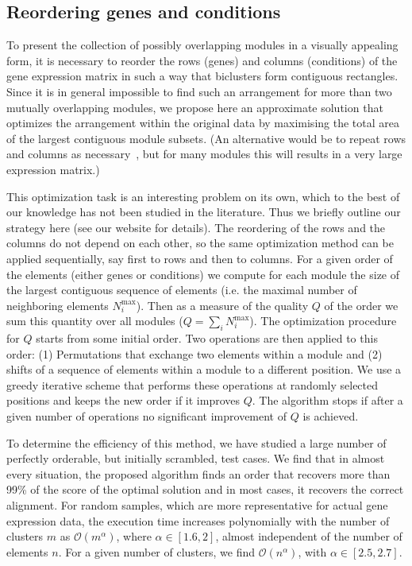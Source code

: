 \documentclass[round]{bioinfo}
\begin{document}
\subsection{Reordering genes and conditions}
To present the collection of possibly overlapping modules in a visually
appealing form, it is necessary to reorder the rows (genes) and
columns (conditions) of the
gene expression matrix in such a way that biclusters form contiguous
rectangles. Since it is in general impossible to find such an
arrangement for more than two mutually overlapping modules, we propose
here an approximate solution that optimizes the arrangement within the
original data by maximising the total area of the largest contiguous
module subsets. (An alternative would be to repeat rows and columns as
necessary~\citep{grothaus06}, but for many modules this will results in
a very large expression matrix.) 

This optimization task is an interesting problem on its own, which to
the best of our knowledge has not been studied in the literature. Thus
we briefly outline our strategy here (see our website for details). 
The reordering of the rows and the columns do not depend on each
other, so the same optimization method can be applied sequentially,
say first to rows and then to columns. For a given order of the
elements (either genes or conditions) we compute for each module the
size of the largest contiguous sequence of elements (i.e. the maximal
number of neighboring elements $N^\text{max}_i$). Then as a measure of the
quality $Q$ of the order we sum this quantity over all modules
($Q=\sum_i N^\text{max}_i$). The optimization procedure for $Q$ starts from
some initial order. Two operations are then applied to this order: (1)
Permutations that exchange two elements within a module and (2) shifts
of a sequence of elements within a module to a different position. We
use a greedy iterative scheme that performs these operations at
randomly selected positions and keeps the new order if it improves
$Q$. The algorithm stops if after a given number of operations no
significant improvement of $Q$ is achieved. 

To determine the efficiency of this method, we have studied a large
number of perfectly orderable, but initially scrambled, test cases. We
find that in almost every situation, the proposed algorithm finds an
order that recovers more than 99\% of the score of the optimal
solution and in most cases, it recovers the correct
alignment. For random samples, which are more representative for
actual gene expression data, the execution time increases polynomially
with the number of clusters $m$ as ${\mathcal O}(m^\alpha)$, where
$\alpha \in [1.6, 2]$, almost independent of the number of elements
$n$. For a given number of clusters, we find ${\mathcal O}(n^\alpha)$,
with $\alpha \in [2.5, 2.7]$. 
\end{document}
